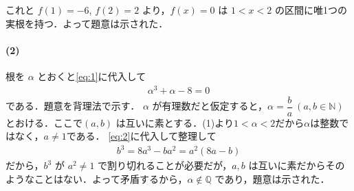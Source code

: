 \documentclass[../../main.tex]{subfiles}
\begin{document}
これと $f(1) = -6$, $f(2) = 2$ より，$f(x) = 0$ は $1 < x < 2$ の区間に唯1つの実根を持つ．よって題意は示された．

\paragraph{(2)}

根を $\alpha$ とおくと\cref{eq:1}に代入して
\begin{align}
  \alpha^3 + \alpha - 8 = 0 \label{eq:2}
\end{align}
である．題意を背理法で示す．
$\alpha$ が有理数だと仮定すると，$\alpha = \dfrac{b}{a}\ (a, b \in \mathbb{N})$ とおける．ここで$(a, b)$ は互いに素とする．(1)より$1<\alpha<2$だから$\alpha$は整数ではなく，$a \neq 1$である．
\cref{eq:2}に代入して整理して
\begin{align}
  b^3 = 8a^3 - b a^2 = a^2(8a - b)
\end{align}
だから，$b^3$ が $a^2 \neq 1$ で割り切れることが必要だが，$a, b$ は互いに素だからそのようなことはない．よって矛盾するから，$\alpha \notin \mathbb{Q}$ であり，題意は示された．

\newpage
\end{document}
